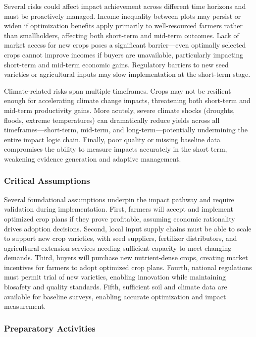 \documentclass{oqireport}
\begin{document}
Several risks could affect impact achievement across different time horizons and must be proactively managed. Income inequality between plots may persist or widen if optimization benefits apply primarily to well-resourced farmers rather than smallholders, affecting both short-term and mid-term outcomes. Lack of market access for new crops poses a significant barrier—even optimally selected crops cannot improve incomes if buyers are unavailable, particularly impacting short-term and mid-term economic gains. Regulatory barriers to new seed varieties or agricultural inputs may slow implementation at the short-term stage.

Climate-related risks span multiple timeframes. Crops may not be resilient enough for accelerating climate change impacts, threatening both short-term and mid-term productivity gains. More acutely, severe climate shocks (droughts, floods, extreme temperatures) can dramatically reduce yields across all timeframes—short-term, mid-term, and long-term—potentially undermining the entire impact logic chain. Finally, poor quality or missing baseline data compromises the ability to measure impacts accurately in the short term, weakening evidence generation and adaptive management.

\subsubsection{Critical Assumptions}
Several foundational assumptions underpin the impact pathway and require validation during implementation. First, farmers will accept and implement optimized crop plans if they prove profitable, assuming economic rationality drives adoption decisions. Second, local input supply chains must be able to scale to support new crop varieties, with seed suppliers, fertilizer distributors, and agricultural extension services needing sufficient capacity to meet changing demands. Third, buyers will purchase new nutrient-dense crops, creating market incentives for farmers to adopt optimized crop plans. Fourth, national regulations must permit trial of new varieties, enabling innovation while maintaining biosafety and quality standards. Fifth, sufficient soil and climate data are available for baseline surveys, enabling accurate optimization and impact measurement.

\subsubsection{Preparatory Activities}
\end{document}
